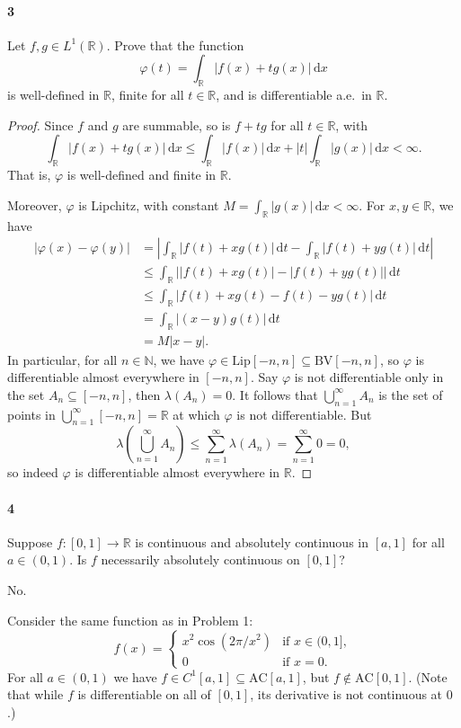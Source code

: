 \documentclass[12pt]{article}
\newlength{\myparskip}
\newenvironment{fullbox}{\begin{lrbox}{\savefullbox}\begin{minipage}{\dimexpr\textwidth-2\fboxsep\relax}\setlength{\parskip}{\myparskip}}{\end{minipage}\end{lrbox}\framebox[\textwidth]{\usebox{\savefullbox}}}
\newenvironment{pbox}[1][]{\begin{fullbox}\ifx#1\empty\else\paragraph{#1}\phantom{}\fi}{\end{fullbox}}
\theoremstyle{definition}
\newcommand{\N}{\mathbb{N}}
\newcommand{\R}{\mathbb{R}}
\renewcommand{\phi}{\varphi}
\newcommand{\<}{\langle}
\renewcommand{\>}{\rangle}
\newcommand{\seq}{\subseteq}
\newcommand{\dd}{\,\mathrm{d}}
\begin{document}
\newpage
\begin{pbox}[3]
    Let $f, g \in L^1(\R)$.
    Prove that the function
    \[
        \phi(t) = \int_\R |f(x) + tg(x)| \dd{x}
    \]
    is well-defined in $\R$, finite for all $t \in \R$, and is differentiable a.e.\ in $\R$.
\end{pbox}

\begin{proof}
    Since $f$ and $g$ are summable, so is $f + tg$ for all $t \in \R$, with
    \[
        \int_\R |f(x) + tg(x)| \dd{x}
            \leq \int_\R |f(x)| \dd{x} + |t|\int_\R |g(x)| \dd{x}
            < \infty.
    \]
    That is, $\phi$ is well-defined and finite in $\R$.

    Moreover, $\phi$ is Lipchitz, with constant $M = \int_\R |g(x)| \dd{x} < \infty$.
    For $x, y \in \R$, we have
    \begin{align*}
        |\phi(x) - \phi(y)|
            &= \left|\int_\R |f(t) + xg(t)| \dd{t} - \int_\R |f(t) + yg(t)| \dd{t}\right| \\
            &\leq \int_\R \big| |f(t) + xg(t)| - |f(t) + yg(t)| \big| \dd{t} \\
            &\leq \int_\R \big| f(t) + xg(t) - f(t) - yg(t) \big| \dd{t} \\
            &= \int_\R |(x - y)g(t)| \dd{t} \\
            &= M|x - y|.
    \end{align*}
    In particular, for all $n \in \N$, we have $\phi \in \mathrm{Lip}[-n, n] \seq \mathrm{BV}[-n, n]$, so $\phi$ is differentiable almost everywhere in $[-n, n]$.
    Say $\phi$ is not differentiable only in the set $A_n \seq [-n, n]$, then $\lambda(A_n) = 0$.
    It follows that $\bigcup_{n=1}^{\infty} A_n$ is the set of points in $\bigcup_{n=1}^{\infty} [-n, n] = \R$ at which $\phi$ is not differentiable.
    But
    \[
        \lambda\left(\bigcup_{n=1}^{\infty} A_n\right)
            \leq \sum_{n=1}^{\infty} \lambda(A_n)
            = \sum_{n=1}^{\infty} 0
            = 0,
    \]
    so indeed $\phi$ is differentiable almost everywhere in $\R$.
\end{proof}


\newpage
\begin{pbox}[4]
    Suppose $f : [0, 1] \to \R$ is continuous and absolutely continuous in $[a, 1]$ for all $a \in (0, 1)$.
    Is $f$ necessarily absolutely continuous on $[0, 1]$?
\end{pbox}

No.

Consider the same function as in Problem 1:
\[
    f(x) = \begin{cases}
        x^2 \cos(2\pi/x^2) &\text{if } x \in (0, 1], \\
        0 &\text{if } x = 0.
    \end{cases}
\]
For all $a \in (0, 1)$ we have $f \in C^1[a, 1] \seq \mathrm{AC}[a, 1]$, but $f \notin \mathrm{AC}[0, 1]$.
(Note that while $f$ is differentiable on all of $[0, 1]$, its derivative is not continuous at $0$.)
\end{document}
